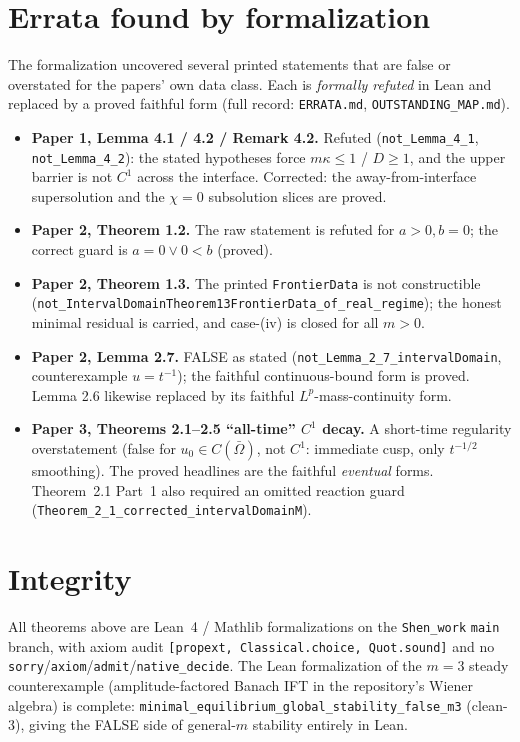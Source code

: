 \documentclass[11pt]{article}
\begin{document}
\section{Errata found by formalization}
The formalization uncovered several printed statements that are false or overstated for the
papers' own data class. Each is \emph{formally refuted} in Lean and replaced by a proved faithful
form (full record: \texttt{ERRATA.md}, \texttt{OUTSTANDING\_MAP.md}).
\begin{itemize}
\item \textbf{Paper 1, Lemma 4.1 / 4.2 / Remark 4.2.} Refuted (\texttt{not\_Lemma\_4\_1},
\texttt{not\_Lemma\_4\_2}): the stated hypotheses force $m\kappa\le1$ / $D\ge1$, and the upper
barrier is not $C^1$ across the interface. Corrected: the away-from-interface supersolution and
the $\chi=0$ subsolution slices are proved.
\item \textbf{Paper 2, Theorem 1.2.} The raw statement is refuted for $a>0,b=0$; the correct guard
is $a=0\lor 0<b$ (proved).
\item \textbf{Paper 2, Theorem 1.3.} The printed \texttt{FrontierData} is not constructible
(\texttt{not\_IntervalDomainTheorem13FrontierData\_of\_real\_regime}); the honest minimal residual
is carried, and case-(iv) is closed for all $m>0$.
\item \textbf{Paper 2, Lemma 2.7.} FALSE as stated (\texttt{not\_Lemma\_2\_7\_intervalDomain},
counterexample $u=t^{-1}$); the faithful continuous-bound form is proved. Lemma 2.6 likewise
replaced by its faithful $L^p$-mass-continuity form.
\item \textbf{Paper 3, Theorems 2.1--2.5 ``all-time'' $C^1$ decay.} A short-time regularity
overstatement (false for $u_0\in C(\bar\Omega)$, not $C^1$: immediate cusp, only $t^{-1/2}$
smoothing). The proved headlines are the faithful \emph{eventual} forms. Theorem~2.1 Part~1 also
required an omitted reaction guard (\texttt{Theorem\_2\_1\_corrected\_intervalDomainM}).
\end{itemize}

\section*{Integrity}
All theorems above are Lean~4 / Mathlib formalizations on the \texttt{Shen\_work} \texttt{main}
branch, with axiom audit \texttt{[propext, Classical.choice, Quot.sound]} and no
\texttt{sorry}/\texttt{axiom}/\texttt{admit}/\texttt{native\_decide}. The Lean formalization of the
$m=3$ steady counterexample (amplitude-factored Banach IFT in the repository's Wiener algebra)
is complete: \texttt{minimal\_equilibrium\_global\_stability\_false\_m3} (clean-3), giving the FALSE side of general-$m$ stability entirely in Lean.
\end{document}
